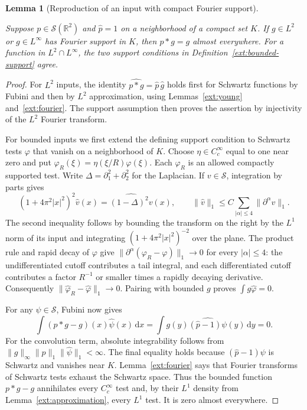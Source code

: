 \documentclass[11pt]{amsart}
\newcommand{\R}{\mathbb R}
\newcommand{\dd}{\,\mathrm d}
\newtheorem{lemma}[theorem]{Lemma}
\theoremstyle{definition}
\theoremstyle{remark}
\numberwithin{equation}{section}
\providecommand{\lean}[1]{}
\providecommand{\leanok}{}
\begin{document}
\begin{lemma}[Reproduction of an input with compact Fourier support]
\label{ext:reproduction}
\lean{Auto.ext_reproduction_L2,Auto.ext_reproduction_bounded,Auto.ext_reproduction_agree}
\leanok
Suppose $p\in\mathcal S(\R^2)$ and $\widehat p=1$ on a
neighborhood of a compact set $K$.  If $g\in L^2$ or $g\in L^\infty$
has Fourier support in $K$, then $p*g=g$ almost everywhere.
For a function in $L^2\cap L^\infty$, the two support conditions in
Definition~\ref{ext:bounded-support} agree.
\end{lemma}
\begin{proof}
For $L^2$ inputs, the identity
$\widehat{p*g}=\widehat p\,\widehat g$ holds first for Schwartz
functions by Fubini and then by $L^2$ approximation, using
Lemmas~\ref{ext:young} and~\ref{ext:fourier}.  The support assumption
then proves the assertion by injectivity of the $L^2$ Fourier transform.

For bounded inputs we first extend the defining support condition to
Schwartz tests $\varphi$ that vanish on a neighborhood of $K$.
Choose $\eta\in C_c^\infty$ equal to one near zero and put
$\varphi_R(\xi)=\eta(\xi/R)\varphi(\xi)$.  Each $\varphi_R$ is an
allowed compactly supported test.  Write
$\Delta=\partial_1^2+\partial_2^2$ for the Laplacian.
If $v\in\mathcal S$, integration by parts gives
\[
 (1+4\pi^2|x|^2)^2\widehat v(x)
       =\widehat{(1-\Delta)^2v}(x),
 \qquad
 \|\widehat v\|_1
       \le C\sum_{|\alpha|\le4}\|\partial^\alpha v\|_1.
\]
The second inequality follows by bounding the transform on the right
by the $L^1$ norm of its input and integrating
$(1+4\pi^2|x|^2)^{-2}$ over the plane.
The product rule and rapid decay of $\varphi$ give
$\|\partial^\alpha(\varphi_R-\varphi)\|_1\to0$ for every
$|\alpha|\le4$: the undifferentiated cutoff contributes a tail
integral, and each differentiated cutoff contributes a factor
$R^{-1}$ or smaller times a rapidly decaying derivative.
Consequently $\|\widehat\varphi_R-\widehat\varphi\|_1\to0$.
Pairing with bounded $g$ proves $\int g\widehat\varphi=0$.

For any $\psi\in\mathcal S$, Fubini now gives
\[
 \int(p*g-g)(x)\widehat\psi(x)\dd x
   =\int g(y)\widehat{(\widehat p-1)\psi}(y)\dd y=0.
\]
For the convolution term, absolute integrability follows from
$\|g\|_\infty\|p\|_1\|\widehat\psi\|_1<\infty$.
The final equality holds because $(\widehat p-1)\psi$ is Schwartz
and vanishes near $K$.  Lemma~\ref{ext:fourier} says that Fourier
transforms of Schwartz tests exhaust the Schwartz space.  Thus the
bounded function $p*g-g$ annihilates every $C_c^\infty$ test and,
by their $L^1$ density from Lemma~\ref{ext:approximation}, every
$L^1$ test.  It is zero almost everywhere.


\end{proof}
\end{document}
